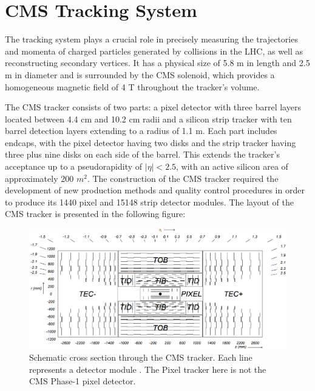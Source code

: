 \section{CMS Tracking System}

The tracking system plays a crucial role in precisely measuring the trajectories and momenta of charged particles generated by collisions in the LHC, as well as reconstructing secondary vertices. It has a physical size of 5.8 m in length and 2.5 m in diameter and is surrounded by the CMS solenoid, which provides a homogeneous magnetic field of 4 T throughout the tracker's volume.

The CMS tracker consists of two parts: a pixel detector with three barrel layers located between 4.4 cm and 10.2 cm radii and a silicon strip tracker with ten barrel detection layers extending to a radius of 1.1 m. Each part includes endcaps, with the pixel detector having two disks and the strip tracker having three plus nine disks on each side of the barrel. This extends the tracker's acceptance up to a pseudorapidity of $|\eta| < 2.5$, with an active silicon area of approximately 200 $m^2$. The construction of the CMS tracker required the development of new production methods and quality control procedures in order to produce its 1440 pixel and 15148 strip detector modules. The layout of the CMS tracker is presented in the following figure:

\begin{center}
  \begin{figure}[ht]
    \centering
    \includegraphics[scale=.23]{Chapter2/strip_layout.png}
    \caption[Schematic cross section through the CMS tracker]{Schematic cross section through the CMS tracker. Each line represents a detector module \cite{CMS_Exp_2008}. The Pixel tracker here is not the CMS Phase-1 pixel detector.}
    \label{strip_layout}
  \end{figure}
\end{center}

